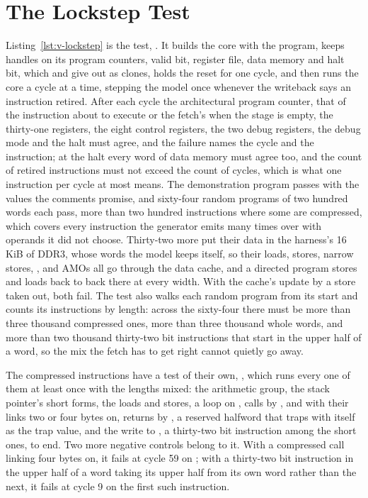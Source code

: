 \documentclass[journal,onecolumn,9pt]{IEEEtran}
\begin{document}


\section{The Lockstep Test}
\label{sec:v-lockstep}

Listing~\ref{lst:v-lockstep} is the test, . It builds the core with the program, keeps
handles on its program counters, valid bit, register file, data
memory and halt bit, which  and  give out as
clones, holds the reset for one cycle, and then runs the core a cycle
at a time, stepping the model once whenever the writeback says an
instruction retired. After each cycle the architectural program
counter, that of the instruction about to execute or the fetch's
when the stage is empty, the thirty-one registers, the eight control
registers, the two debug registers, the debug mode and the halt must
agree, and the failure names the cycle
and the instruction; at the halt every word of data memory must
agree too, and the count of
retired instructions must not exceed the count of cycles, which is
what one instruction per cycle at most means. The demonstration program passes with the values the
comments promise, and sixty-four random programs of two hundred
words each pass, more than two hundred instructions where some are
compressed, which covers every instruction the generator
emits many times over with operands it did not choose. Thirty-two more put
their data in the harness's 16 KiB of DDR3, whose words the model keeps
itself, so their loads, stores, narrow stores,
,  and AMOs all go through the data cache, and a
directed program stores and loads back to back there at every width.
With the cache's update by a store taken out, both fail. The test also
walks each random program from its start and counts its instructions
by length: across the sixty-four there must be more than three
thousand compressed ones, more than three thousand whole words, and
more than two thousand thirty-two bit instructions that start in the
upper half of a word, so the mix the fetch has to get right cannot
quietly go away.

The compressed instructions have a test of their own,
, which runs every one of them at
least once with the lengths mixed: the arithmetic group, the stack
pointer's short forms, the loads and stores, a loop on
, calls by ,  and 
with their links two or four bytes on, returns by , a
reserved halfword that traps with itself as the trap value, and the
write to , a thirty-two bit instruction among the short
ones, to end. Two more negative controls belong to it. With
a compressed call linking four bytes on, it fails at cycle 59 on
; with a thirty-two bit instruction in the upper half of a
word taking its upper half from its own word rather than the next, it
fails at cycle 9 on the first such instruction.
\end{document}
